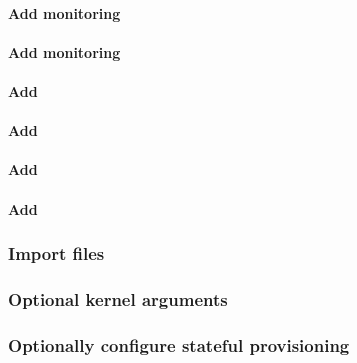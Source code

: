 \documentclass[letterpaper]{article}
\begin{document}
\paragraph{Add \Nagios{} monitoring}


\paragraph{Add \Ganglia{} monitoring}


\paragraph{Add \clustershell{}}


\paragraph{Add \mrsh{}}


\paragraph{Add \genders{}}


\paragraph{Add \conman{}} \label{sec:add_conman}


\subsubsection{Import files} \label{sec:file_import}



\vspace*{0.3cm}





\clearpage
\subsubsection{Optional kernel arguments} \label{sec:optional_kargs}


\subsubsection{Optionally configure stateful provisioning}

\end{document}
